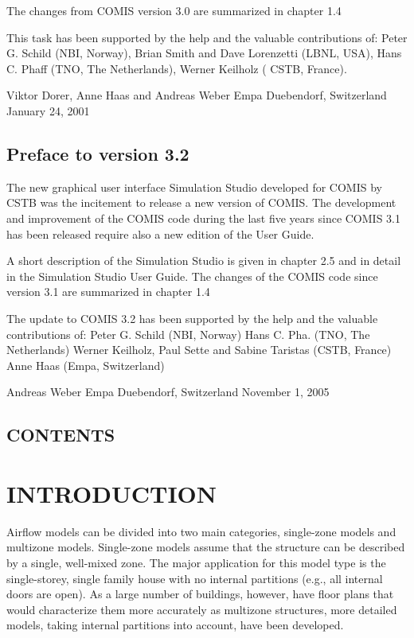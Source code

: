 \documentclass[10pt]{book}
\begin{document}
The changes from COMIS version 3.0 are summarized in chapter 1.4 

This task has been supported by the help and the valuable contributions of: 
Peter G. Schild (NBI, Norway), Brian Smith and Dave Lorenzetti (LBNL, USA), Hans C. Phaff (TNO, The Netherlands), Werner Keilholz ( CSTB, France). 

Viktor Dorer, Anne Haas and Andreas Weber 
Empa Duebendorf, Switzerland 
January 24, 2001 

\section*{Preface to version 3.2}
The new graphical user interface Simulation Studio developed for COMIS by CSTB was the incitement to release a new version of COMIS. The development and improvement of the COMIS code during the last five years since COMIS 3.1 has been released require also a new edition of the User Guide. 

A short description of the Simulation Studio is given in chapter 2.5 and in detail in the Simulation Studio User Guide. The changes of the COMIS code since version 3.1 are summarized in chapter 1.4 

The update to COMIS 3.2 has been supported by the help and the valuable contributions of: 
Peter G. Schild (NBI, Norway) 
Hans C. Pha. (TNO, The Netherlands) 
Werner Keilholz, Paul Sette and Sabine Taristas (CSTB, France) 
Anne Haas (Empa, Switzerland) 

Andreas Weber 
Empa Duebendorf, Switzerland 
November 1, 2005

\section{CONTENTS}
\mainmatter
\chapter{INTRODUCTION}
Airflow models can be divided into two main categories, single-zone models and multizone models. Single-zone models assume that the structure can be described by a single, well-mixed zone. The major application for this model type is the single-storey, single family house with no internal partitions (e.g., all internal doors are open). As a large number of buildings, however, have floor plans that would characterize them more accurately as multizone structures, more detailed models, taking internal partitions into account, have been developed.
\end{document}

